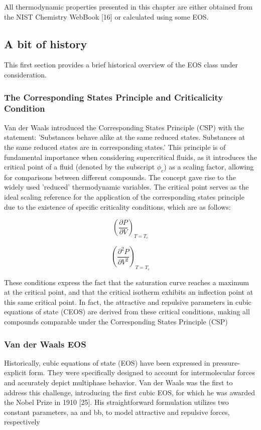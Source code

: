 All thermodynamic properties presented in this chapter are either obtained from
the NIST Chemistry WebBook [16] or calculated using some EOS.
		
	\subsection{A bit of history}
	This first section provides a brief historical overview of the EOS class
	under consideration.

	\subsubsection{The Corresponding States Principle and Criticalicity Condition}
	Van der Waals introduced the Corresponding States Principle (CSP) with the
	statement: 'Substances behave alike at the same reduced states. Substances
	at the same reduced states are in corresponding states.' This principle is
	of fundamental importance when considering supercritical fluids, as it
	introduces the critical point of a fluid (denoted by the subscript $\phi_c$) as
	a scaling factor, allowing for comparisons between different compounds. The
	concept gave rise to the widely used 'reduced' thermodynamic variables. The
	critical point serves as the ideal scaling reference for the application of
	the corresponding states principle due to the existence of specific
	criticality conditions, which are as follows:

	\begin{equation}
		\left(\frac{\partial P}{\partial V}\right)_{T=T_c}
	\end{equation}

	\begin{equation}
		\left(\frac{\partial^2 P}{\partial V^2}\right)_{T=T_c}
	\end{equation}

	These conditions express the fact that the saturation curve reaches a
	maximum at the critical point, and that the critical isotherm exhibits an
	inflection point at this same critical point. In fact, the attractive and
	repulsive parameters in cubic equations of state (CEOS) are derived from
	these critical conditions, making all compounds comparable under the
	Corresponding States Principle (CSP)

	\subsubsection{Van der Waals EOS}
	Historically, cubic equations of state (EOS) have been expressed in
	pressure-explicit form. They were specifically designed to account for
	intermolecular forces and accurately depict multiphase behavior. Van der
	Waals was the first to address this challenge, introducing the first cubic
	EOS, for which he was awarded the Nobel Prize in 1910 [25]. His
	straightforward formulation utilizes two constant parameters, aa and bb, to
	model attractive and repulsive forces, respectively

